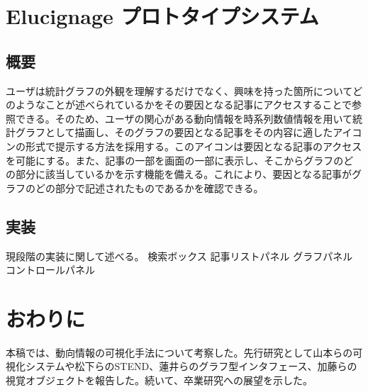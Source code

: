\documentclass{matsushita-zemi}
\begin{document}
\section{Elucignage プロトタイプシステム}
\subsection{概要}
ユーザは統計グラフの外観を理解するだけでなく、興味を持った箇所についてどのようなことが述べられているかをその要因となる記事にアクセスすることで参照できる。そのため、ユーザの関心がある動向情報を時系列数値情報を用いて統計グラフとして描画し、そのグラフの要因となる記事をその内容に適したアイコンの形式で提示する方法を採用する。このアイコンは要因となる記事のアクセスを可能にする。また、記事の一部を画面の一部に表示し、そこからグラフのどの部分に該当しているかを示す機能を備える。これにより、要因となる記事がグラフのどの部分で記述されたものであるかを確認できる。
\subsection{実装}
現段階の実装に関して述べる。
検索ボックス
記事リストパネル
グラフパネル
コントロールパネル

\section{おわりに}
本稿では、動向情報の可視化手法について考察した。先行研究として山本らの可視化システムや松下らのSTEND、蓮井らのグラフ型インタフェース、加藤らの視覚オブジェクトを報告した。続いて、卒業研究への展望を示した。



\end{document}
